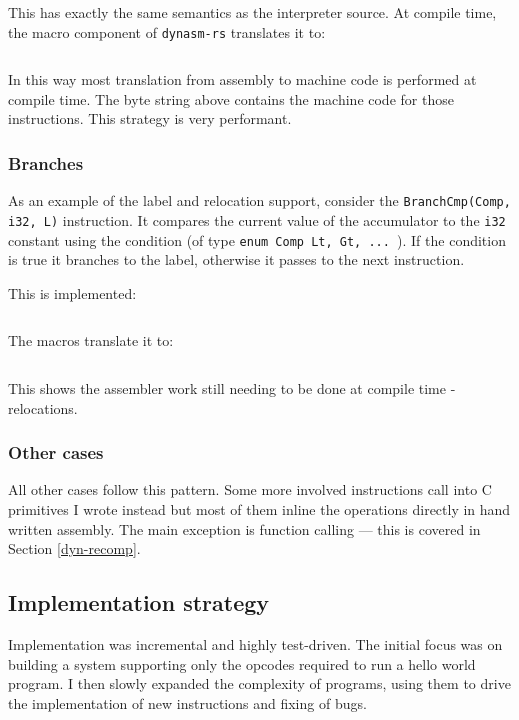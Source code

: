 This has exactly the same semantics as the interpreter source. At compile time, the macro component
of \texttt{dynasm-rs} translates it to:

\inputminted{rust}{snippets/add_comp.rs}

In this way most translation from assembly to machine code is performed at compile time. The byte
string above contains the machine code for those instructions. This strategy is very performant.

\subsubsection{Branches}

As an example of the label and relocation support, consider the \texttt{BranchCmp(Comp, i32, L)}
instruction. It
compares the current value of the accumulator to the \texttt{i32} constant using the condition (of
type \texttt{enum Comp {Lt, Gt, ... }}). If the condition is true it branches to the label,
otherwise it passes to the next instruction.

This is implemented:

\inputminted{rust}{snippets/branchcmp.rs}

The macros translate it to:

\inputminted{rust}{snippets/branchcmp_comp.rs}

This shows the assembler work still needing to be done at compile time - relocations.

\subsubsection{Other cases}

All other cases follow this pattern. Some more involved instructions call into C primitives
I wrote instead but most of them inline the operations directly in hand written assembly. The main
exception is function calling --- this is covered in Section \ref{dyn-recomp}.

\subsection{Implementation strategy}

Implementation was incremental and highly test-driven. The initial focus was on building a system
supporting only the opcodes required to run a hello world program. I then slowly expanded the
complexity of programs, using them to drive the implementation of new instructions and fixing of
bugs.

